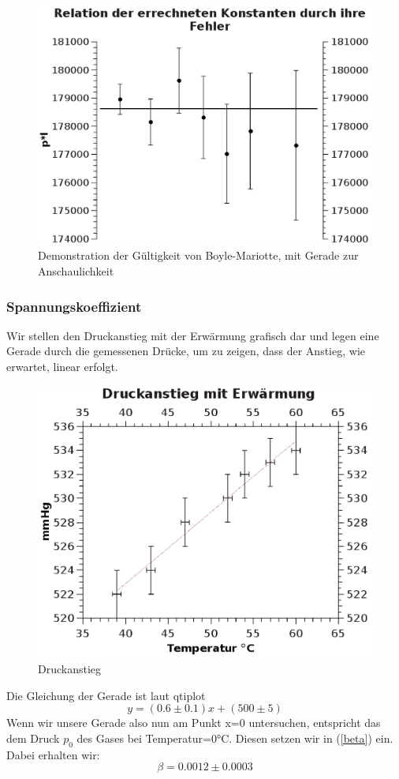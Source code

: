 \documentclass{article}
\begin{document}
\begin{center}
\begin{figure}
\caption{Demonstration der Gültigkeit von Boyle-Mariotte, mit Gerade zur Anschaulichkeit}
\includegraphics[scale=0.7]{Graph1.eps}
\end{figure}
\end{center}

\subsubsection{Spannungskoeffizient}
Wir stellen den Druckanstieg mit der Erwärmung grafisch dar und legen eine Gerade durch die gemessenen Drücke, um zu zeigen, dass der Anstieg, wie erwartet, linear erfolgt.



\begin{center}
\begin{figure}

\includegraphics[scale=0.7]{warmdruck.eps}
\caption{Druckanstieg}
\end{figure}
\end{center}
Die Gleichung der Gerade ist laut qtiplot  $$y=(0.6 \pm 0.1)x+(500\pm5)$$
Wenn wir unsere Gerade also nun am Punkt x=0 untersuchen, entspricht das dem Druck $p_0$ des Gases bei Temperatur=0°C. Diesen setzen wir in (\ref{beta}) ein. \\
Dabei erhalten wir:
$$\beta=0.0012 \pm 0.0003 $$
\end{document}
